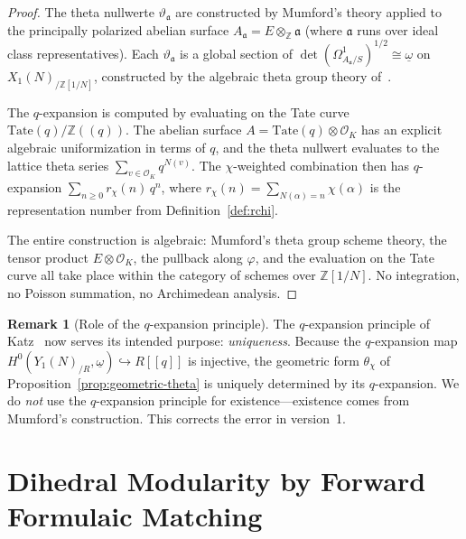\documentclass[11pt,a4paper]{article}
\theoremstyle{plain}
\theoremstyle{definition}
\newtheorem{remark}[theorem]{Remark}
\newcommand{\Z}{\mathbb{Z}}
\begin{document}
\begin{proof}
The theta nullwerte $\vartheta_\mathfrak{a}$ are constructed by Mumford's theory applied to the principally polarized abelian surface $A_\mathfrak{a} = E \otimes_\Z \mathfrak{a}$ (where $\mathfrak{a}$ runs over ideal class representatives).
Each $\vartheta_\mathfrak{a}$ is a global section of $\det(\Omega^1_{A_\mathfrak{a}/S})^{1/2} \cong \underline{\omega}$ on $X_1(N)_{/\Z[1/N]}$, constructed by the algebraic theta group theory of~\cite{mumford66}.

The $q$-expansion is computed by evaluating on the Tate curve $\mathrm{Tate}(q)/\Z(\!(q)\!)$.
The abelian surface $A = \mathrm{Tate}(q) \otimes \mathcal{O}_K$ has an explicit algebraic uniformization in terms of $q$, and the theta nullwert evaluates to the lattice theta series $\sum_{v \in \mathcal{O}_K} q^{N(v)}$.
The $\chi$-weighted combination then has $q$-expansion $\sum_{n \geq 0} r_\chi(n)\, q^n$, where $r_\chi(n) = \sum_{N(\alpha) = n} \chi(\alpha)$ is the representation number from Definition~\ref{def:rchi}.

The entire construction is algebraic: Mumford's theta group scheme theory, the tensor product $E \otimes \mathcal{O}_K$, the pullback along $\varphi$, and the evaluation on the Tate curve all take place within the category of schemes over $\Z[1/N]$.
No integration, no Poisson summation, no Archimedean analysis.
\end{proof}

\begin{remark}[Role of the $q$-expansion principle]\label{rem:qexp}
The $q$-expansion principle of Katz~\cite{katz73} now serves its intended purpose: \emph{uniqueness}. Because the $q$-expansion map $H^0(Y_1(N)_{/R}, \underline{\omega}) \hookrightarrow R[\![q]\!]$ is injective, the geometric form $\theta_\chi$ of Proposition~\ref{prop:geometric-theta} is uniquely determined by its $q$-expansion.
We do \emph{not} use the $q$-expansion principle for existence---existence comes from Mumford's construction.
This corrects the error in version~1.
\end{remark}


\section{Dihedral Modularity by Forward Formulaic Matching}\label{sec:matching}
\end{document}

